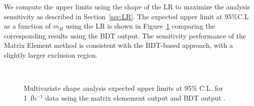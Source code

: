 \documentclass{cmspaper}
\begin{document}
We compute the upper limits using the shape of the LR to maximize the analysis sensitivity as described in 
Section~\ref{sec:LR}. The expected upper limit at 95\%C.L as a function of $m_H$ using the LR is shown in 
Figure~\ref{fig:me_expected_1fb} comparing the corresponding results using the BDT output. 
The sensitivity performance of the Matrix Element method is consistent with the BDT-based approach, with a 
slightly larger exclusion region. 

\begin{figure}[!hbtp]
\centering
{}
 \\
\caption{ 
Multivariate shape analysis expected upper limits at 95\% C.L. for 1~fb$^{-1}$ data using the 
matrix elemement output  and BDT output . } 
\label{fig:me_expected_1fb}
\end{figure}
\end{document}
